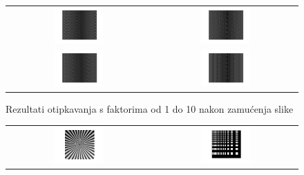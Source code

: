 \documentclass[12pt, a4]{report}
\begin{document}
\begin{enumerate}
\begin{figure}[ht]
\begin{tabular}{cc}
                        \includegraphics[width=0.35\textwidth]{sampleL_7} & \includegraphics[width=0.35\textwidth]{sampleL_8} \\
                        \includegraphics[width=0.35\textwidth]{sampleL_9} & \includegraphics[width=0.35\textwidth]{sampleL_10}
                    \end{tabular}
                    \caption{Rezultati otipkavanja s faktorima od 1 do 10 nakon zamućenja slike}
                    \label{fig:sampling2}
                \end{figure}
                \begin{figure}
                    \centering
                    \begin{tabular}{cc}
                        \includegraphics[width=0.35\textwidth]{testpat1} & \includegraphics[width=0.35\textwidth]{testpat2} \\

\end{tabular}
\end{figure}
\end{enumerate}
\end{document}
